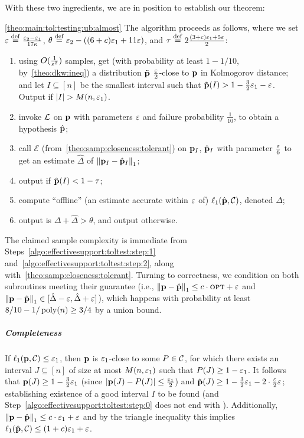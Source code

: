 \noindent With these two ingredients, we are in position to establish our theorem:
\begin{proofof}{\cref{theo:main:tol:testing:ub:almost}}
The algorithm proceeds as follows, where we set $\eps\eqdef\frac{\eps_2-\eps_1}{17\kappa}$, $\theta\eqdef\eps_2 - ((6+c)\eps_1+11\eps)$, and $\tau \eqdef2 \frac{(3+c)\eps_1+5\eps}{2}$:
\begin{enumerate}[(1)]
  \item\label{algo:effectivesupport:toltest:step:0} using $O(\frac{1}{\eps^2})$ samples, get (with probability at least $1-1/10$, by~\cref{theo:dkw:ineq}) a distribution $\tilde{\D}$ $\frac{\eps}{2}$-close to $\D$ in Kolmogorov distance; and let $I\subseteq[n]$ be the smallest interval such that $\tilde{\D}(I) > 1-\frac{3}{2}\eps_1-\eps$. Output \reject if $\abs{I} > M(n,\eps_1)$.
  \item\label{algo:effectivesupport:toltest:step:1} invoke $\Learner$ on $\D$ with parameters $\eps$ and failure probability $\frac{1}{10}$, to obtain a hypothesis $\hat{\D}$;
  \item\label{algo:effectivesupport:toltest:step:2}  call $\mathcal{E}$ (from~\cref{theo:samp:closeness:tolerant}) on $\D_I$, $\hat{\D}_I$ with parameter $\frac{\eps}{6}$ to get an estimate $\hat{\Delta}$ of $\normone{\D_I-\hat{\D}_I}$;
  \item\label{algo:effectivesupport:toltest:step:2.5} output \reject if $\hat{\D}(I) < 1-\tau$; 
  \item\label{algo:effectivesupport:toltest:step:3}  compute ``offline'' (an estimate accurate within $\eps$ of) $\lp[1](\hat{\D},\class)$, denoted $\Delta$;
  \item\label{algo:effectivesupport:toltest:step:4}  output \reject is $\Delta+\hat{\Delta} > \theta$, and output \accept otherwise.
\end{enumerate}
The claimed sample complexity is immediate from Steps~\ref{algo:effectivesupport:toltest:step:1} and~\ref{algo:effectivesupport:toltest:step:2}, along with~\cref{theo:samp:closeness:tolerant}. Turning to correctness, we condition on both subroutines meeting their guarantee (i.e., $\normone{\D-\hat{\D}} \leq c\cdot\opt+\eps$ and $\normone{\D-\hat{\D}} \in [\hat{\Delta} - \eps,\hat{\Delta} + \eps]$), which happens with probability at least $8/10-1/\poly(n)\geq 3/4$ by a union bound. 

\subparagraph{Completeness} If $\lp[1](\D,\class) \leq \eps_1$, then $\D$ is $\eps_1$-close to some $P\in\class$, for which there exists an interval $J\subseteq[n]$ of size at most $M(n,\eps_1)$ such that $P(J) \geq 1-\eps_1$. It follows that $\D(J) \geq 1-\frac{3}{2}\eps_1$ (since $\abs{\D(J)-P(J)} \leq \frac{\eps_1}{2}$) and $\tilde{\D}(J) \geq 1-\frac{3}{2}\eps_1-2\cdot\frac{\eps}{2}\eps$; establishing existence of a good interval $I$ to be found (and Step~\ref{algo:effectivesupport:toltest:step:0} does not end with \reject). Additionally, $\normone{\D-\hat{\D}} \leq c\cdot\eps_1+\eps$ and by the triangle inequality this implies $\lp[1](\hat{\D},\class) \leq (1+c)\eps_1+\eps$.
  

\end{proofof}
